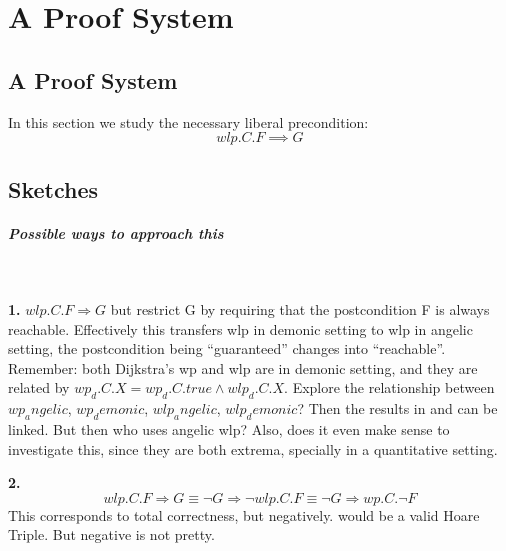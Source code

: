 \chapter{A Proof System}\label{ch:system} %

\section{A Proof System}
In this section we study the necessary liberal precondition: 
$$wlp.C.F\implies G$$


\section{Sketches} 

\paragraph{Possible ways to approach this}\ 

\textbf{1.} $wlp.C.F \Longrightarrow G $ but restrict G by requiring that the postcondition F is always reachable. 
Effectively this transfers wlp in demonic setting to wlp in angelic setting, the postcondition being ``guaranteed'' changes into ``reachable''. 
Remember: both Dijkstra's wp and wlp are in demonic setting, and they are related by $wp_d.C.X = wp_d.C.true \wedge wlp_d.C.X$. 
Explore the relationship between $wp_angelic$, $wp_demonic$, $wlp_angelic$, $wlp_demonic$? 
Then the results in \cite{zhang22} and \cite{dijkstra90} can be linked. 
But then who uses angelic wlp? 
Also, does it even make sense to investigate this, since they are both extrema, specially in a quantitative setting. 

\textbf{2.}$$wlp.C.F \Longrightarrow G \equiv \neg G \Longrightarrow \neg wlp.C.F \equiv \neg G \Longrightarrow  wp.C.\neg F $$ 
This corresponds to total correctness, but negatively. 
 would be a valid Hoare Triple. 
But negative is not pretty. 

